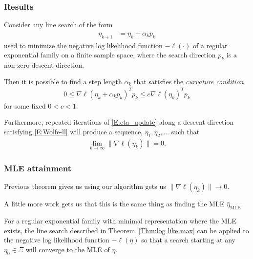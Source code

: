 \documentclass[slidestop,compress, 10pt]{beamer}
\newcommand{\etaMLE}{\hat{\eta}_{\textrm{MLE}}}
\begin{document}
\frame
{
\frametitle{Results}
{\small
\begin{theorem} \label{Thm:log like max}
Consider any line search of the form 
\begin{align}
	\eta_{k+1} &= \eta_k + \alpha_k p_k \label{E:eta_update}
\end{align}
used to minimize the negative log likelihood function $-\ell(\cdot)$ of a regular 
exponential family on a finite sample space, where the search direction $p_k$ 
is a non-zero descent direction.

Then it is possible to find a step length $\alpha_k$ 
that satisfies the \emph{curvature condition}
\begin{align}
	0 \leq \nabla \ell( \eta_k + \alpha_k p_k)^T p_k  \leq c \nabla \ell(\eta_k)^T p_k  
\label{E:Wolfe-ll}
\end{align}
for some fixed $0 < c < 1$.

Furthermore, repeated iterations of \eqref{E:eta_update} along a descent direction 
satisfying \eqref{E:Wolfe-ll} will produce a sequence, $\eta_1, \eta_2, \ldots$ such 
that
\begin{align*}
	\lim_{k \to \infty} \lVert \nabla \ell(\eta_k) \rVert = 0.
\end{align*}
\end{theorem}
}
}

\frame
{
\frametitle{MLE attainment}
Previous theorem gives us using our algorithm gets us 
$\lVert \nabla \ell(\eta_k) \rVert \to 0$.  

A little more work gets us that 
this is the same thing as finding the MLE $\etaMLE$.

\begin{theorem} \label{Thm:Line Search works}
For a regular exponential family with minimal representation where the MLE exists, the 
line search described in 
Theorem~\ref{Thm:log like max} can be applied to the negative log likelihood function 
$-\ell(\eta)$ so that a search 
starting at any $\eta_0 \in \Xi$ will converge to the MLE of $\eta$.
\end{theorem}

}
\end{document}

